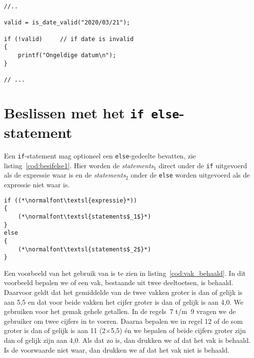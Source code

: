 \begin{lstlisting}[caption=Gebruik van de negatie-operator.,label=cod:besif2]
//..

valid = is_date_valid("2020/03/21");

if (!valid)     // if date is invalid
{
    printf("Ongeldige datum\n");
}

// ...
\end{lstlisting}


\section{Beslissen met het \texttt{if else}-statement}
Een \texttt{if}-statement mag optioneel een \texttt{else}-gedeelte bevatten, zie listing~\ref{cod:besifelse1}. Hier worden de \textsl{statements}$_1$ direct onder de \texttt{if} uitgevoerd als de expressie waar is en de \textsl{statements}$_2$ onder de \texttt{else} worden uitgevoerd als de expressie niet waar is.

\begin{lstlisting}[caption=Algemene opzet van het \texttt{if else}-statement.,label=cod:besifelse1]
if ((*\normalfont\textsl{expressie}*))
{
    (*\normalfont\textsl{statements$_1$}*)
}
else
{
    (*\normalfont\textsl{statements$_2$}*)
}
\end{lstlisting}



Een voorbeeld van het gebruik van  is te zien in listing~\ref{cod:vak_behaald}. In dit voorbeeld bepalen we of een vak, bestaande uit twee deeltoetsen, is behaald. Daarvoor geldt dat het gemiddelde van de twee vakken groter is dan of gelijk is aan 5,5 en dat voor beide vakken het cijfer groter is dan of gelijk is aan 4,0. We gebruiken voor het gemak gehele getallen. In de regels~7 t/m~9 vragen we de gebruiker om twee cijfers in te voeren. Daarna bepalen we in regel 12 of de som groter is dan of gelijk is aan 11 (2$\times$5,5) én we bepalen of beide cijfers groter zijn dan of gelijk zijn aan 4,0. Als dat zo is, dan drukken we af dat het vak is behaald. Is de voorwaarde niet waar, dan drukken we af dat het vak niet is behaald.

